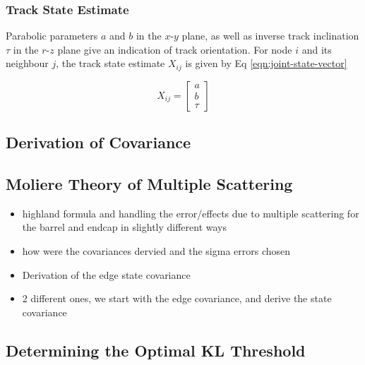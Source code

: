 \subsubsection{Track State Estimate}

Parabolic parameters $a$ and $b$ in the $x$-$y$ plane, as well as inverse track inclination $\tau$ in the $r$-$z$ plane give an indication of track orientation. For node $i$ and its neighbour $j$, the track state estimate $X_{ij}$ is given by Eq \eqref{eqn:joint-state-vector}

\begin{equation}
X_{ij} = \begin{bmatrix} a \\ b \\ \tau \end{bmatrix}
\label{eqn:joint-state-vector}
\end{equation}






\subsection{Derivation of Covariance}

\subsection{Moliere Theory of Multiple Scattering}
\begin{itemize}
\item highland formula and handling the error/effects due to multiple scattering for the barrel and endcap in slightly different ways
\item how were the covariances dervied and the sigma errors chosen
\item Derivation of the edge state covariance
\item 2 different ones, we start with the edge covariance, and derive the state covariance
\end{itemize}





\subsection{Determining the Optimal KL Threshold}
\label{chapter-6-kl-threshold}

